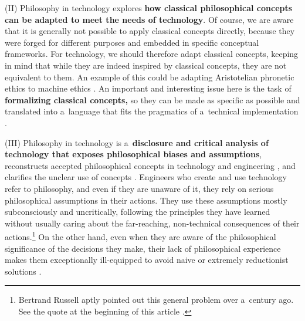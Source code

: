 (II) Philosophy in technology explores \textbf{how classical philosophical concepts can be adapted to meet the needs of technology}. Of course, we are aware that it is generally not possible to apply classical concepts directly, because they were forged for different purposes and embedded in specific conceptual frameworks. For technology, we should therefore adapt classical concepts, keeping in mind that while they are indeed inspired by classical concepts, they are not equivalent to them. An example of this could be adapting Aristotelian phronetic ethics to machine ethics 
\parencites[][]{polak_phronetic_2020}[][]{polak_ethics_2020}. %
 An important and interesting issue here is the task of \textbf{formalizing classical concepts,} so they can be made as specific as possible and translated into a~language that fits the pragmatics of a~technical implementation 
\parencites[e.g][]{darowski_relacja_2006}[][]{tavani_ethics_2013}.%




(III) Philosophy in technology is a~\textbf{disclosure and critical analysis of technology that exposes philosophical biases and assumptions}, reconstructs accepted philosophical concepts in technology and engineering 
\parencite[e.g][]{smith_promise_2019}, %
 and clarifies the unclear use of concepts 
\parencite[e.g][]{cervantes_artificial_2019}. %
 Engineers who create and use technology refer to philosophy, and even if they are unaware of it, they rely on serious philosophical assumptions in their actions. They use these assumptions mostly subconsciously and uncritically, following the principles they have learned without usually caring about the far-reaching, non-technical consequences of their actions.\footnote{Bertrand Russell aptly pointed out this general problem over a~century ago. See the quote at the beginning of this article 
\parencite[][pp.243–244]{russell_problems_1912}.%
} On the other hand, even when they are aware of the philosophical significance of the decisions they make, their lack of philosophical experience makes them exceptionally ill-equipped to avoid naive or extremely reductionist solutions 
\parencite[cf][]{}.%




